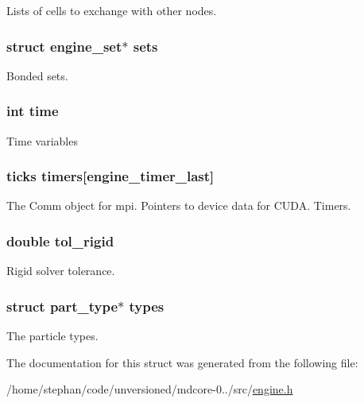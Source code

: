 Lists of cells to exchange with other nodes. \hypertarget{structengine_a5eab4a887e3d36026b70dd4e4e372630}{
\subsubsection[{sets}]{\setlength{\rightskip}{0pt plus 5cm}struct {\bf engine\-\_\-set}$\ast$ sets}}\label{structengine_a5eab4a887e3d36026b70dd4e4e372630}
Bonded sets. \hypertarget{structengine_a42715f65f02da52edc5b22021d8ae670}{
\subsubsection[{time}]{\setlength{\rightskip}{0pt plus 5cm}int time}}\label{structengine_a42715f65f02da52edc5b22021d8ae670}
Time variables \hypertarget{structengine_ab82bc5d54d6f200a605c3aace671671c}{
\subsubsection[{timers}]{\setlength{\rightskip}{0pt plus 5cm}ticks timers\mbox{[}{\bf engine\-\_\-timer\-\_\-last}\mbox{]}}}\label{structengine_ab82bc5d54d6f200a605c3aace671671c}
The Comm object for mpi. Pointers to device data for C\-U\-D\-A. Timers. \hypertarget{structengine_a5d4ff08ea8e350214c1a46663b229500}{
\subsubsection[{tol\-\_\-rigid}]{\setlength{\rightskip}{0pt plus 5cm}double tol\-\_\-rigid}}\label{structengine_a5d4ff08ea8e350214c1a46663b229500}
Rigid solver tolerance. \hypertarget{structengine_a476fc4b80594201e7819214e03a97f11}{
\subsubsection[{types}]{\setlength{\rightskip}{0pt plus 5cm}struct {\bf part\-\_\-type}$\ast$ types}}\label{structengine_a476fc4b80594201e7819214e03a97f11}
The particle types. 

The documentation for this struct was generated from the following file\-:\begin{DoxyCompactItemize}
\item 
/home/stephan/code/unversioned/mdcore-\/0../src/\hyperlink{engine_8h}{engine.\-h}\end{DoxyCompactItemize}
